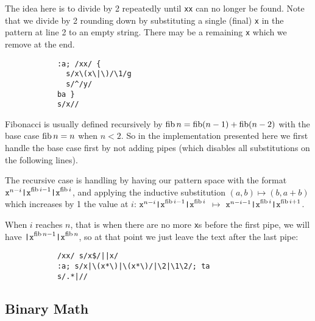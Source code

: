 \begin{description}
	\item[Logarithm: $x^n\mapsto y^{\lfloor\log_2 n\rfloor}$:]

		The idea here is to divide by 2 repeatedly until {\tt xx} can no longer
		be found.  Note that we divide by 2 rounding down by substituting a
		single (final) {\tt x} in the pattern at line 2 to an empty string.
		There may be a remaining {\tt x} which we remove at the end.

		\begin{Verbatim}
			:a; /xx/ {
			  s/x\(x\|\)/\1/g
			  s/^/y/
			ba }
			s/x//
		\end{Verbatim}

	\item{}

	\item[Fibonacci: $\texttt{x}^n\mapsto \texttt{x}^{\fib n}$:]

		Fibonacci is usually defined recursively by $\mathop{\mathrm{fib}} n = \mathop{\mathrm{fib}} (n-1) +
		\mathop{\mathrm{fib}} (n-2)$ with the base case $\mathop{\mathrm{fib}} n = n$ when $n<2$.  So in the
		implementation presented here we first handle the base case first by
		not adding pipes (which disables all substitutions on the following
		lines).

		The recursive case is handling by having our pattern space with the
		format $\texttt{x}^{n-i}\texttt{|x}^{\mathop{\mathrm{fib}} i-1}\texttt{|x}^{\mathop{\mathrm{fib}} i}$,
		and applying the inductive substitution $(a,b)\mapsto (b,a+b)$
		which increases by 1 the value at $i$:
		$\texttt{x}^{n-i}\texttt{|x}^{\mathop{\mathrm{fib}} i-1}\texttt{|x}^{\mathop{\mathrm{fib}} i}$
		$\mapsto$
		$\texttt{x}^{n-i-1}\texttt{|x}^{\mathop{\mathrm{fib}} i}\texttt{|x}^{\mathop{\mathrm{fib}} i+1}$.

		When $i$ reaches $n$, that is when there are no more {\tt x}s before
		the first pipe, we will have $\texttt{|x}^{\mathop{\mathrm{fib}} n-1}\texttt{|x}^{\mathop{\mathrm{fib}} n}$,
		so at that point we just leave the text after the last pipe:

		\begin{Verbatim}
			/xx/ s/x$/||x/
			:a; s/x|\(x*\)|\(x*\)/|\2|\1\2/; ta
			s/.*|//
		\end{Verbatim}

\end{description}

\subsection{Binary Math}

